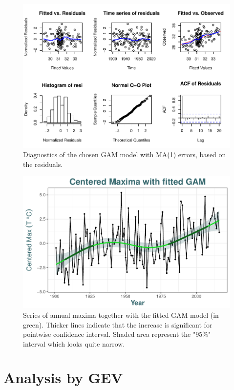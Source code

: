 \documentclass[11pt,a4paper,openany ]{book}
\begin{document}
\begin{figure}[!htb]
	\includegraphics[width=\linewidth]{diagnogam.pdf}\caption{Diagnostics of the chosen GAM model with MA(1) errors, based on the residuals. }\label{fig:diagnogam}
\end{figure}


\begin{figure}[!htb]
\centering	\includegraphics[width=.75\linewidth]{max_gam.pdf}\caption{Series of annual maxima together with the fitted GAM model (in green). Thicker lines indicate that the increase is significant for pointwise confidence interval. Shaded area represent the "$95\%$" interval which looks quite narrow. }\label{fig:center_gam}
\end{figure}




\section{Analysis by GEV}
\end{document}
